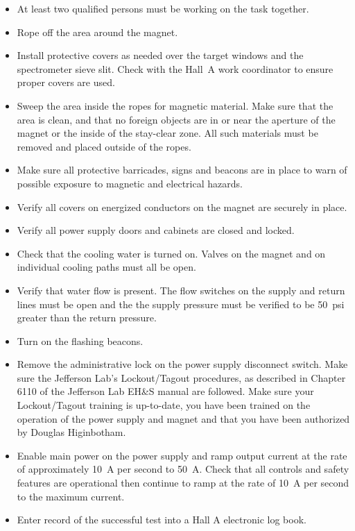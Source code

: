 \begin{itemize}
\item{At least two qualified persons must be working on the task together.}
\item{Rope off the area around the magnet.}
\item{Install protective covers as needed over the target windows and the spectrometer
sieve slit.  Check with the Hall~A work coordinator to ensure proper covers are used.}
\item{Sweep the area inside the ropes for magnetic material.  Make sure that the area is clean,
and that no foreign objects are in or near the aperture of the magnet or the inside of the stay-clear zone.
All such materials must be removed and placed outside of the ropes.}
\item{Make sure all protective barricades, signs and beacons are in place to warn of possible exposure 
to magnetic and electrical hazards.}
\item{Verify all covers on energized conductors on the magnet are securely in place.}
\item{Verify all power supply doors and cabinets are closed and locked.}
\item{Check that the cooling water is turned on.  Valves on the magnet and on individual cooling paths must all
be open.}
\item{Verify that water flow is present.  The flow switches on the supply and return lines must be open and the 
the supply pressure must be verified to be 50~psi greater than the return pressure.}
\item{Turn on the flashing beacons.}
\item{Remove the administrative lock on the power supply disconnect switch.  Make sure the Jefferson Lab's
Lockout/Tagout procedures, as described in Chapter 6110 of the Jefferson Lab EH\&S manual are followed.
Make sure your Lockout/Tagout training is up-to-date, you have been trained on the operation of the power
supply and magnet and that you have been authorized by Douglas Higinbotham.}
\item{Enable main power on the power supply and ramp output current at the rate of approximately 10~A per
second to 50~A.  Check that all controls and safety features are operational then continue to ramp at the
rate of 10~A per second to the maximum current.}
\item{Enter record of the successful test into a Hall A electronic log book.}
\end{itemize}


